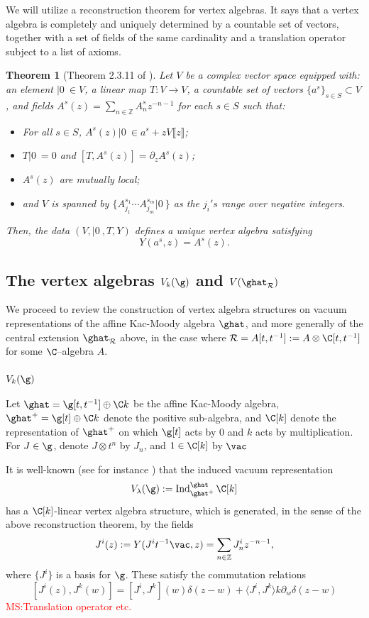 \documentclass[12pt]{amsart}
\newtheorem{theorem}{Theorem}[section]
\theoremstyle{definition}
\theoremstyle{remark}
\newcommand{\on}{\operatorname}
\newcommand{\R}{\mathcal{R}}
\def\matt{\textcolor{red}{MS:}\textcolor{red}}
\begin{document}
We will utilize a reconstruction theorem for vertex
algebras. It says that a vertex algebra is completely and uniquely determined by a
countable set of vectors, together with a set of fields of the same
cardinality and a translation operator subject to a list
of axioms. 

\begin{theorem}[Theorem 2.3.11 of \cite{FBZ}] Let $V$ be a complex vector space equipped with: an
  element $|0 \> \in V$, a linear map $T : V \to V$, a countable
    set of vectors $\{a^s\}_{s \in S} \subset V$, and fields $A^s(z) =
    \sum_{n \in \mathbb{Z}} A_n^sz^{-n-1}$ for each $s\in S$ such that:
\begin{itemize}
\item For all $s \in S$, $A^s(z) |0\> \in a^s + z V\llbracket
    z\rrbracket$;
\item $T |0\> = 0$ and $[T,A^s(z)] = \partial_z A^s(z)$;
\item $A^s(z)$ are mutually local;
\item and $V$ is spanned by $\{A_{j_1}^{s_1} \cdots A_{j_m}^{s_m}
  |0\>\}$ as the $j_i's$ range over negative integers. 
\end{itemize}
Then, the data $(V,|0\>, T,Y)$ defines a unique vertex algebra satisfying 
\[
Y(a^s,z) = A^s(z) .
\]
\end{theorem}

\subsection{The vertex algebras $V_{k}(\g)$ and $V(\ghat_{\R})$}

We proceed to review the construction of vertex algebra structures on vacuum representations of the affine Kac-Moody algebra $\ghat$, and more generally of the central extension $\ghat_{\R}$ above, in the case where $\R = A[t,t^{-1}] := A \otimes \C[t,t^{-1}]$ for some $\C$--algebra $A$. 

\subsubsection{$V_{k}(\g)$}
Let $\ghat = \g[t,t^{-1}] \oplus \C k$ be the affine Kac-Moody algebra, $\ghat^{+} = \g[t] \oplus \C k$ denote the positive sub-algebra, and $\C[k]$ denote the representation of $\ghat^{+}$ on which $\g[t]$ acts by $0$ and $k$ acts by multiplication. For $J \in \g$, denote $J \otimes t^n$ by $J_n$, and $1 \in \C[k]$ by $\vac$

It is well-known (see for instance \cite{FBZ}) that the induced vacuum representation
\[
V_{\lambda}(\g) := \on{Ind}^{\ghat}_{\ghat^+} \C[k]
\] 
has a $\C[k]$-linear vertex algebra structure, which is generated, in the sense of the above reconstruction theorem, by the fields
\[
J^i (z) := Y(J^{i} t^{-1} \vac, z) = \sum_{n \in \mathbb{Z}} J^i_n z^{-n-1},
\]
where $\{ J^{i} \}$ is a basis for $\g$. These satisfy the commutation relations
\[
[J^i(z), J^{k}(w)] = [J^{i}, J^{k}](w) \delta(z-w) +  \langle J^{i}, J^{k} \rangle k \partial_w \delta(z-w)
\]
\matt{Translation operator etc.}
\end{document}
